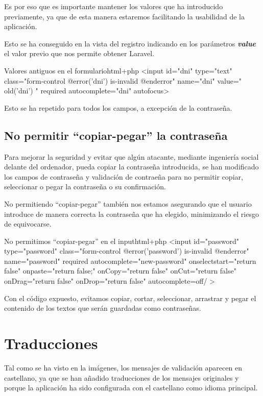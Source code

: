 \documentclass{\ClassPath/viu-tfm-template}
\begin{document}
Es por eso que es importante mantener los valores que ha introducido previamente, ya que de esta manera estaremos facilitando la usabilidad de la aplicación.

Esto se ha conseguido en la vista del registro indicando en los parámetros \textit{\textbf{value}} el valor previo que nos permite obtener Laravel.


\begin{mycode}{Valores antiguos en el formulario}{html+php}{}
<input id="dni" type="text" class="form-control
    @error('dni') is-invalid @enderror" name="dni"
    value="{{ old('dni') }}"
    required autocomplete="dni" autofocus>
\end{mycode}

Esto se ha repetido para todos los campos, a excepción de la contraseña.

\subsection{No permitir “copiar-pegar” la contraseña}
Para mejorar la seguridad y evitar que algún atacante, mediante ingeniería social delante del ordenador, pueda copiar la contraseña introducida, se han modificado los campos de contraseña y validación de contraeña para no permitir copiar, seleccionar o pegar la contraseña o su confirmación.

No permitiendo “copiar-pegar” también nos estamos asegurando que el usuario introduce de manera correcta la contraseña que ha elegido, minimizando el riesgo de equivocarse.

\begin{mycode}{No permitimos “copiar-pegar” en el input}{html+php}{}
<input id="password" type="password" class="form-control
    @error('password') is-invalid @enderror"
    name="password" required autocomplete="new-password"
    onselectstart="return false"
    onpaste="return false;"
    onCopy="return false"
    onCut="return false"
    onDrag="return false"
    onDrop="return false"
    autocomplete=off/
>
\end{mycode}

Con el código expuesto, evitamos copiar, cortar, seleccionar, arrastrar y pegar el contenido de los textos que serán guardadas como contraseñas.

\section{Traducciones}
Tal como se ha visto en la imágenes, los mensajes de validación aparecen en castellano, ya que se han añadido traducciones de los mensajes originales y porque la aplicación ha sido configurada con el castellano como idioma principal.
\end{document}
